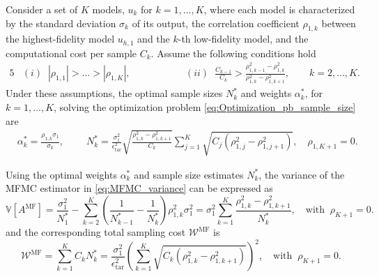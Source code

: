 %
\begin{theorem}
\label{thm:Sample_size_est}
Consider a set of $K$ models, $u_k$ for $k=1,\ldots,K$, where each model is characterized by the standard deviation $\sigma_k$ of its output, the correlation coefficient $\rho_{1,k}$ between the highest-fidelity model $u_{h,1}$ and the $k$-th low-fidelity model, and the computational cost per sample $C_k$. Assume the following conditions hold
%
\begin{alignat*}{5}
    &(i)\;\; |\rho_{1,1}|>\ldots>|\rho_{1,K}|,& \qquad \qquad
    &(ii)\;\; \frac{C_{k-1}}{C_k}>\frac{\rho_{1,k-1}^2-\rho_{1,k}^2}{\rho_{1,k}^2-\rho_{1,k+1}^2},\quad \quad k=2,\ldots,K.
\end{alignat*}
%
Under these assumptions, the optimal sample sizes $N_k^*$ and weights $\alpha_k^*$, for $k=1,\ldots, K$, solving the optimization problem \eqref{eq:Optimization_pb_sample_size} are
%
\begin{align}
    \label{eq:MFMC_SampleSize}
    &\alpha_k^*=\frac{\rho_{1,k}\sigma_1}{\sigma_k},\qquad \;N_k^*=\frac{\sigma_1^2}{\epsilon_\text{tar}^2}\sqrt{\frac{\rho_{1,k}^2-\rho_{1,k+1}^2}{C_k}}\sum_{j=1}^K\sqrt{C_j\left(\rho_{1,j}^2-\rho_{1,j+1}^2\right)}, \quad \rho_{1,K+1}=0.
\end{align}
%

Using the optimal weights $\alpha_k^*$ and sample size estimates $N_k^*$, the variance of the MFMC estimator in \eqref{eq:MFMC_variance} can be expressed as
%
\begin{equation}
\label{eq:MFMC_variance_optimal}
\mathbb{V}\left[A^{\text{MF}}\right] =\frac{\sigma_1^2}{N_1^*} - \sum_{k=2}^K \left(\frac{1}{N_{k-1}^*} - \frac{1}{N_k^*}\right)\rho_{1,k}^2\sigma_1^2=\sigma_1^2 \sum_{k=1}^K\frac{\rho_{1,k}^2 - \rho_{1,k+1}^2}{N_k^*},\quad \text{with}\;\;\rho_{K+1}=0.
\end{equation}
%
and the corresponding total sampling cost $\mathcal{W}^\text{MF}$ is
%
\begin{equation}\label{eq:MFMC_sampling_cost}
    \mathcal{W}^\text{MF} = \sum_{k=1}^K C_k N_k^* = \frac{\sigma_1^2}{\epsilon_{\text{tar}}^2}\left(\sum_{k=1}^K\sqrt{C_k\left(\rho_{1,k}^2 - \rho_{1,k+1}^2\right)}\right)^2,\quad \text{with}\;\;\rho_{K+1}=0.
\end{equation}
%
\end{theorem}



